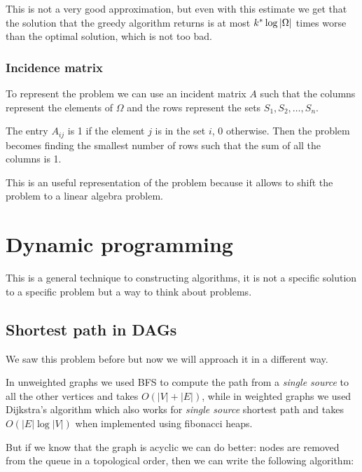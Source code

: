 \documentclass[12pt]{extarticle}
\begin{document}
This is not a very good approximation, but even with this estimate we get that the solution that the greedy algorithm returns is at most $k^* \log \abs{\Omega}$ times worse than the optimal solution, which is not too bad.

\subsubsection{Incidence matrix}

To represent the problem we can use an incident matrix $A$ such that the columns represent the elements of $\Omega$ and the rows represent the sets $S_1, S_2, \ldots, S_n$.

The entry $A_{ij}$ is 1 if the element $j$ is in the set $i$, 0 otherwise.
Then the problem becomes finding the smallest number of rows such that the sum of all the columns is 1.

This is an useful representation of the problem because it allows to shift the problem to a linear algebra problem.

\section{Dynamic programming}

This is a general technique to constructing algorithms, it is not a specific solution to a specific problem but a way to think about problems.

\subsection{Shortest path in DAGs}

We saw this problem before but now we will approach it in a different way.

In unweighted graphs we used BFS to compute the path from a \textit{single source} to all the other vertices and takes $O(|V| + |E|)$, while in weighted graphs we used Dijkstra's algorithm which also works for \textit{single source} shortest path and takes $O(|E| \log |V|)$ when implemented using fibonacci heaps.

But if we know that the graph is acyclic we can do better: nodes are removed from the queue in a topological order, then we can write the following algorithm:
\end{document}
